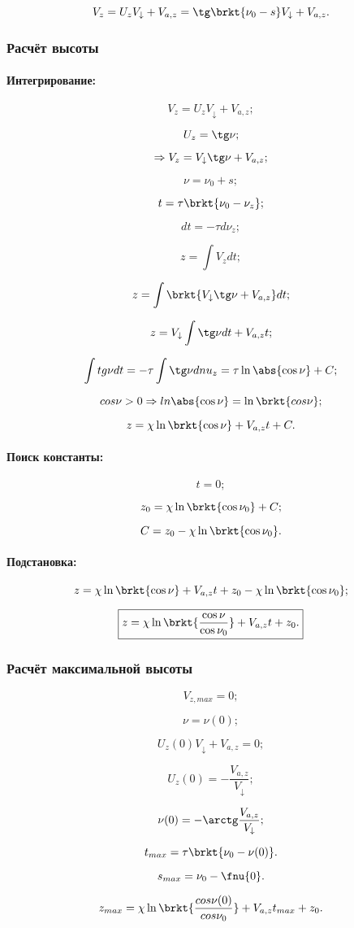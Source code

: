 $$V_z = U_z V_\downarrow + V_{a,z} = \tg \brkt{ \nu_{0} - s } V_\downarrow + V_{a,z}.$$


\subsubsection{Расчёт высоты}
\paragraph{Интегрирование:}

$$V_z = U_z V_\downarrow + V_{a,z};$$

$$U_z = \tg \nu;$$

$$\Rightarrow V_z = V_\downarrow \tg \nu + V_{a,z};$$

$$\nu = \nu_{0} + s;$$

$$t = \tau \brkt{ \nu_{0} - \nu_{z} };$$

$$dt = -\tau d\nu_{z};$$

$$z = \int V_z dt;$$

$$z = \int \brkt{ V_\downarrow \tg \nu + V_{a,z} } dt;$$

$$z = V_\downarrow \int \tg \nu dt + V_{a,z}t;$$

$$\int tg \nu dt = -\tau \int \tg \nu d nu_z = \tau \ln \abs{\cos \nu } + C;$$

$$cos \nu > 0 \Rightarrow ln \abs{  \cos \nu } = \ln \brkt{  cos \nu };$$

$$z = \chi \ln \brkt{ \cos \nu } +  V_{a,z}t + C.$$

\paragraph{Поиск константы:}

$$t=0;$$

$$z_0 = \chi \ln \brkt{  \cos \nu_{0} } + C;$$

$$C = z_0 - \chi \ln \brkt{  \cos \nu_{0} }.$$

\paragraph{Подстановка:}

$$z = \chi \ln \brkt{  \cos \nu } +  V_{a,z}t + z_0 - \chi \ln \brkt{  \cos \nu_{0} };$$

$$\boxed{
z = \chi \ln \brkt{  \frac{\cos \nu}{\cos \nu_{0}}  }  +  V_{a,z}t + z_0.
}$$

\subsubsection{Расчёт максимальной высоты}

$$V_{z,max}=0;$$

$$\nu=\nu(0);$$

$$U_z(0) V_\downarrow + V_{a,z} = 0;$$

$$U_z(0)=-\frac{V_{a,z}}{V_\downarrow};$$

$$\nu(0)=-\arctg \frac{V_{a,z}}{V_\downarrow};$$

$$t_{max}= \tau \brkt{ \nu_{0} - \nu(0) }.$$

$$s_{max} = \nu_{0} - \fnu{0}.$$

$$z_{max} = \chi \ln \brkt{ \frac{cos \nu(0)}{cos \nu_{0}} } + V_{a,z}t_{max} + z_0.$$%
